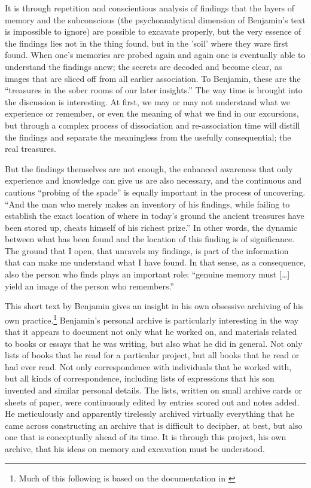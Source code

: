 \documentclass[11pt,a4paper]{article}
\begin{document}
\noindent
It is through repetition and conscientious analysis of findings that the layers of memory and the subconscious (the psychoanalytical dimension of Benjamin's text is impossible to ignore) are possible to excavate properly, but the very essence of the findings lies not in the thing found, but in the 'soil' where they ware first found. When one's memories are probed again and again one is eventually able to understand the findings anew; the secrets are decoded and become clear, as images that are sliced off from all earlier association. To Benjamin, these are the ``treasures in the sober rooms of our later insights.'' \citep[p. 576]{benjamin2005} The way time is brought into the discussion is interesting. At first, we may or may not understand what we experience or remember, or even the meaning of what we find in our excursions, but through a complex process of dissociation and re-association time will distill the findings and separate the meaningless from the usefully consequential; the real treasures.

But the findings themselves are not enough, the enhanced awareness that only experience and knowledge can give us are also necessary, and the continuous and cautious ``probing of the spade'' is equally important in the process of uncovering. ``And the man who merely makes an inventory of his findings, while failing to establish the exact location of where in today’s ground the ancient treasures have been stored up, cheats himself of his richest prize.'' \citep[p. 576]{benjamin2005} In other words, the dynamic between what has been found and the location of this finding is of significance. The ground that I open, that unravels my findings, is part of the information that can make me understand what I have found. In that sense, as a consequence, also the person who finds plays an important role: ``genuine memory must [\ldots] yield an image of the person who remembers.'' \citep[p. 576]{benjamin2005}

This short text by Benjamin gives an insight in his own obsessive archiving of his own practice.\footnote{Much of this following is based on the documentation in \citet{benjamin2007}} Benjamin's personal archive is particularly interesting in the way that it appears to document not only what he worked on, and materials related to books or essays that he was writing, but also what he did in general. Not only lists of books that he read for a particular project, but all books that he read or had ever read. Not only correspondence with individuals that he worked with, but all kinds of correspondence, including lists of expressions that his son invented and similar personal details. The lists, written on small archive cards or sheets of paper, were continuously edited by entries scored out and notes added. He meticulously and apparently tirelessly archived virtually everything that he came across constructing an archive that is difficult to decipher, at best, but also one that is conceptually ahead of its time. It is through this project, his own archive, that his ideas on memory and excavation must be understood.
\end{document}
